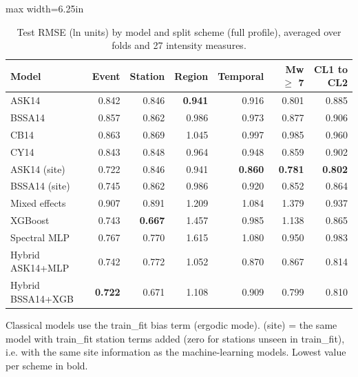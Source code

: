 \begin{table}[htbp]
\centering
\caption{Test RMSE (ln units) by model and split scheme (full profile), averaged over folds and 27 intensity measures.}
\label{tab:table3_accuracy}
\small
\begin{adjustbox}{max width=6.25in}
\begin{tabular}{lrrrrrr}
\toprule
Model & Event & Station & Region & Temporal & Mw $\geq$ 7 & CL1 to CL2 \\
\midrule
ASK14 & 0.842 & 0.846 & \textbf{0.941} & 0.916 & 0.801 & 0.885 \\
BSSA14 & 0.857 & 0.862 & 0.986 & 0.973 & 0.877 & 0.906 \\
CB14 & 0.863 & 0.869 & 1.045 & 0.997 & 0.985 & 0.960 \\
CY14 & 0.843 & 0.848 & 0.964 & 0.948 & 0.859 & 0.902 \\
ASK14 (site) & 0.722 & 0.846 & 0.941 & \textbf{0.860} & \textbf{0.781} & \textbf{0.802} \\
BSSA14 (site) & 0.745 & 0.862 & 0.986 & 0.920 & 0.852 & 0.864 \\
Mixed effects & 0.907 & 0.891 & 1.209 & 1.084 & 1.379 & 0.937 \\
XGBoost & 0.743 & \textbf{0.667} & 1.457 & 0.985 & 1.138 & 0.865 \\
Spectral MLP & 0.767 & 0.770 & 1.615 & 1.080 & 0.950 & 0.983 \\
Hybrid ASK14+MLP & 0.742 & 0.772 & 1.052 & 0.870 & 0.867 & 0.814 \\
Hybrid BSSA14+XGB & \textbf{0.722} & 0.671 & 1.108 & 0.909 & 0.799 & 0.810 \\
\bottomrule
\end{tabular}
\end{adjustbox}
\par\smallskip
\parbox{6.25in}{\footnotesize Classical models use the train\_fit bias term (ergodic mode). (site) = the same model with train\_fit station terms added (zero for stations unseen in train\_fit), i.e. with the same site information as the machine-learning models. Lowest value per scheme in bold.}
\end{table}
